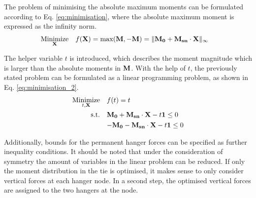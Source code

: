 The problem of minimising the absolute maximum moments can be formulated according to Eq. \eqref{eq:minimisation}, where the absolute maximum moment is expressed as the infinity norm.
\begin{align}
    \underset{{\bf X}}{\text{Minimize}} \quad & f({\bf X}) = \max({\bf M}, -{\bf M}) = \|{\bf M_0} + {\bf M_{sn}} \cdot {\bf X}\|_{\infty} 
    \label{eq:minimisation}
\end{align}

The helper variable $t$ is introduced, which describes the moment magnitude which is larger than the absolute moments in ${\bf M}$. With the help of $t$, the previously stated problem can be formulated as a linear programming problem, as shown in Eq. \eqref{eq:minimisation_2}.
\begin{align}
    \underset{t, {\bf X}}{\text{Minimize}} \quad & f(t) = t \label{eq:minimisation_2} \\
    \text{s.t.} \quad & {\bf M_0} + {\bf M_{sn}} \cdot {\bf X} - t {\bf 1} \leq  0 \nonumber \\
    \quad & {-\bf M_0} - {\bf M_{sn}} \cdot {\bf X} - t {\bf 1} \leq 0 \nonumber
\end{align}

Additionally, bounds for the permanent hanger forces can be specified as further inequality conditions. It should be noted that under the consideration of symmetry the amount of variables in the linear problem can be reduced. If only the moment distribution in the tie is optimised, it makes sense to only consider vertical forces at each hanger node. In a second step, the optimised vertical forces are assigned to the two hangers at the node.

